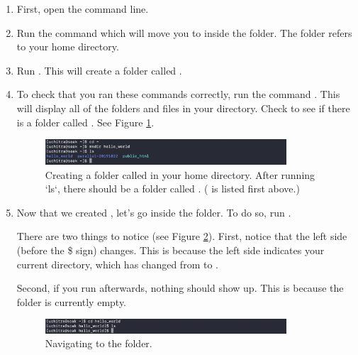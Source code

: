 \begin{enumerate}
\item 
First, open the command line. 
\item Run the command  which will move you to inside the \codeblock{$\sim$} folder. The \codeblock{$\sim$}  folder refers to your home directory.
\item 
Run . This will create a folder called . 
\item 
To check that you ran these commands correctly, run the command . This will display all of the folders and files in your directory. Check to see if there is a folder called . See Figure \ref{fig:linux:exercise:one}.

\begin{figure}[ht]
	\centering
	\includegraphics[width=0.85\textwidth]{images/commandLineExercise_one}
	\caption{Creating a folder called  in your home directory. After running `ls`, there should be a folder called . ( is listed first above.)}
	\label{fig:linux:exercise:one}
\end{figure}

\item 
Now that we created , let's go inside the folder. To do so, run . 

There are two things to notice (see Figure \ref{fig:linux:exercise:two}). First, notice that the left side (before the \$ sign) changes. This is because the left side indicates your current directory, which has changed from \codeblock{$\sim$} to .

Second, if you run  afterwards, nothing should show up. This is because the  folder is currently empty.

\begin{figure}[ht]
	\centering
	\includegraphics[width=0.85\textwidth]{images/commandLineExercise_two}
	\caption{Navigating to the  folder.}
	\label{fig:linux:exercise:two}
\end{figure}


\end{enumerate}
